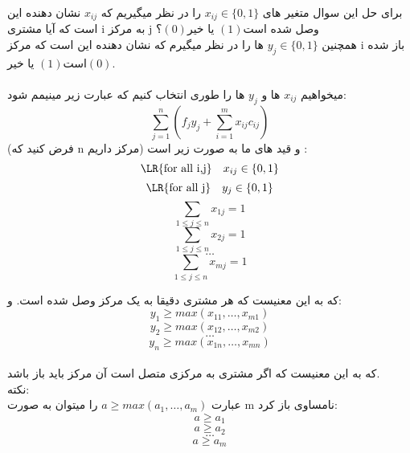 \problem{}
برای حل این سوال متغیر های $x_{ij} \in \{0,1\}$ را
در نظر میگیریم که $x_{ij}$ نشان دهنده این است که آیا مشتری i به
مرکز j وصل شده است$(1)$ یا خیر$(0)$؟\\
همچنین $y_{j} \in \{0,1\}$ ها را در نظر میگیرم که 
نشان دهنده این است که مرکز i باز شده است$(1)$ یا خیر$(0)$.\\\\
میخواهیم $x_{ij}$  ها و $y_j$ ها را طوری انتخاب کنیم که عبارت زیر مینیمم شود:
\[ \sum_{j = 1}^{n}{(f_j y_j + \sum_{i = 1}^{m}{x_{ij}c_{ij}})}\]
(فرض کنید که n مرکز داریم)
و قید های ما به صورت زیر است :\\
\[ \text{\LR{for all i,j}} \quad x_{ij} \in \{0,1\} \]
\[ \text{\LR{for all j}} \quad y_{j} \in \{0,1\} \]
\[ \sum_{1\leq j\leq n}{x_{1j}} = 1\]
\[ \sum_{1\leq j\leq n}{x_{2j}} = 1\]
\[ \dots \]
\[ \sum_{1\leq j\leq n}{x_{mj}} = 1\]

که به این معنیست که هر مشتری
دقیقا به یک مرکز وصل شده است.
و:\\
\[ y_1 \geq max(x_{11},\dots,x_{m1})\]
\[ y_2 \geq max(x_{12},\dots,x_{m2})\]
\[ \dots \]
\[ y_n \geq max(x_{1n},\dots,x_{mn})\]
\\
که به این معنیست که اگر مشتری به مرکزی متصل است آن مرکز باید باز باشد.\\
نکته:\\
عبارت
$a \geq max(a_1,\dots,a_m)$
را میتوان به صورت m نامساوی باز کرد:\\
\[ a\geq a_1\]
\[ a\geq a_2\]
\[ \dots \]
\[ a\geq a_m\]